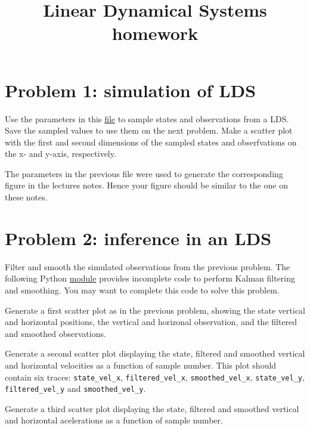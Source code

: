 \documentclass{article}
\title{Linear Dynamical Systems homework}
\author{}
\date{}
\begin{document}
\maketitle

\section*{Problem 1: simulation of LDS}

Use the parameters in this
\href{https://github.com/joacorapela/probabilisticModelingCourse/blob/master/lds/data/00000002_simulation_params.npz}{file}
to sample states and observations from a LDS. Save the sampled values to use
them on the next problem. Make a scatter plot with the first and second
dimensions of the sampled states and obserfvations on the x- and y-axis,
respectively.

The parameters in the previous file were used to generate the corresponding
figure in the lectures notes. Hence your figure should be similar to the one on
these notes.

\section*{Problem 2: inference in an LDS}

Filter and smooth the simulated observations from the previous problem. The
following Python
\href{https://github.com/joacorapela/probabilisticModelingCourse/blob/master/lds/code/src/inference.py}{module}
provides incomplete code to perform Kalman filtering and smoothing. You may
want to complete this code to solve this problem.

Generate a first scatter plot as in the previous problem, showing the state
vertical and horizontal positions, the vertical and horizonal observation, and
the filtered and smoothed observations.

Generate a second scatter plot displaying the state, filtered and smoothed
vertical and horizontal velocities as a function of sample number. This plot
should contain six traces: \texttt{state\_vel\_x}, \texttt{filtered\_vel\_x},
\texttt{smoothed\_vel\_x}, \texttt{state\_vel\_y}, \texttt{filtered\_vel\_y} and
\texttt{smoothed\_vel\_y}.

Generate a third scatter plot displaying the state, filtered and smoothed
vertical and horizontal acelerations as a function of sample number.
\end{document}
